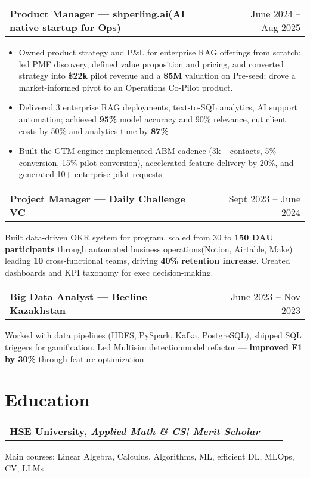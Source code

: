 \documentclass[a4paper,12pt]{article}
\makeatletter
\newenvironment{jobshort}[2]
    {
    \begin{tabularx}{\linewidth}{@{}l X r@{}}
    \textbf{#1} & \hfill &  #2 \\[0.25pt]
    \end{tabularx}
    }
    {
    }
\newenvironment{joblong}[2]
    {
    \begin{tabularx}{\linewidth}{@{}l X r@{}}
    \textbf{#1} & \hfill &  #2 \\[0.25pt]
    \end{tabularx}
    \begin{minipage}[t]{\linewidth}
    \begin{itemize}[leftmargin=1em,label=--]
    }
    {
    \end{itemize}
    \end{minipage}    
    }
\makeatother
\begin{document}
\begin{joblong}{Product Manager — \href{https://shperling.ai}{shperling.ai}(AI native startup for Ops)}{June 2024 – Aug 2025}
\item Owned product strategy and P\&L for enterprise RAG offerings from scratch: led PMF discovery, defined value proposition and pricing, and converted strategy into \textbf{\$22k} pilot revenue and a \textbf{\$5M} valuation on Pre-seed; drove a market-informed pivot to an Operations Co-Pilot product.
\item Delivered 3 enterprise RAG deployments, text-to-SQL analytics, AI support automation; achieved \textbf{95\%} model accuracy and 90\% relevance, cut client costs by 50\+\% and analytics time by \textbf{87\%}
\item Built the GTM engine: implemented ABM cadence (3k+ contacts, 5\% conversion, 15\% pilot conversion), accelerated feature delivery by 20\%, and generated 10+ enterprise pilot requests
\end{joblong}


\begin{jobshort}{Project Manager — Daily Challenge VC}{Sept 2023 – June 2024}
Built data-driven OKR system for program, scaled from 30 to \textbf{150 DAU participants} through automated business operations(Notion, Airtable, Make) leading \textbf{10} cross-functional teams, driving \textbf{40\% retention increase}. Created dashboards and KPI taxonomy for exec decision-making.
\end{jobshort}


\begin{jobshort}{Big Data Analyst — Beeline Kazakhstan}{June 2023 – Nov 2023}
Worked with data pipelines (HDFS, PySpark, Kafka, PostgreSQL), shipped SQL triggers for gamification. Led Multisim detectionmodel refactor — \textbf{improved F1 by 30\%} through feature optimization.
\end{jobshort}
\section{Education}
\begin{jobshort}{HSE University, \textit{Applied Math \& CS| Merit Scholar}}{}
\end{jobshort}
\noindent Main courses: Linear Algebra, Calculus, Algorithms, ML, efficient DL, MLOps, CV, LLMs
\end{document}
